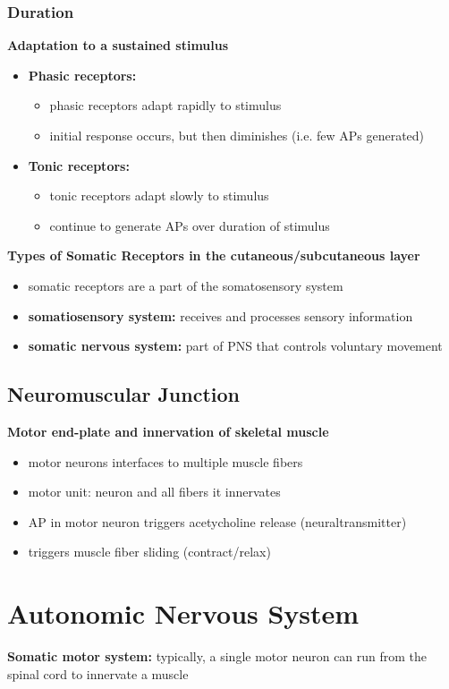 \documentclass[11pt,fleqn]{book}
\begin{document}
\subsubsection{Duration}
\textbf{Adaptation to a sustained stimulus}
\begin{itemize}
    \item \textbf{Phasic receptors:} 
    \begin{itemize}
        \item phasic receptors adapt rapidly to stimulus
        \item initial response occurs, but then diminishes (i.e. few APs generated)
    \end{itemize}
    \item \textbf{Tonic receptors:}
    \begin{itemize}
        \item tonic receptors adapt slowly to stimulus
        \item continue to generate APs over duration of stimulus
    \end{itemize}
\end{itemize}

\textbf{Types of Somatic Receptors in the cutaneous/subcutaneous layer}
\begin{itemize}
    \item somatic receptors are a part of the somatosensory system
    \item \textbf{somatiosensory system:} receives and processes sensory information
    \item \textbf{somatic nervous system:} part of PNS that controls voluntary movement
\end{itemize}

\subsection{Neuromuscular Junction}
\textbf{Motor end-plate and innervation of skeletal muscle}
\begin{itemize}
    \item motor neurons interfaces to multiple muscle fibers
    \item motor unit: neuron and all fibers it innervates
    \item AP in motor neuron triggers acetycholine release (neuraltransmitter)
    \item triggers muscle fiber sliding (contract/relax)
\end{itemize}

\section{Autonomic Nervous System}
\textbf{Somatic motor system:} typically, a single motor neuron can run from the spinal cord to innervate a muscle
\end{document}

